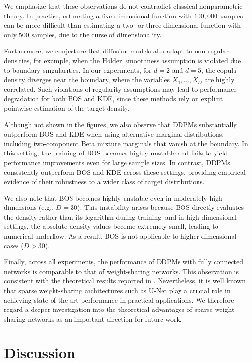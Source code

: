 \documentclass[twoside,11pt]{article}
\newcommand{\Holder}{H\"{o}lder}
\begin{document}
We emphasize that these observations do not contradict classical nonparametric theory. In practice, estimating a five-dimensional function with $100{,}000$ samples can be more difficult than estimating a two- or three-dimensional function with only $500$ samples, due to the curse of dimensionality.

Furthermore, we conjecture that diffusion models also adapt to non-regular densities, for example, when the \Holder \ smoothness assumption is violated due to boundary singularities.
In our experiments, for $d = 2$ and $d = 5$, the copula density diverges near the boundary, where the variables $X_1,\ldots,X_{D}$ are highly correlated.
Such violations of regularity assumptions may lead to performance degradation for both BOS and KDE, since these methods rely on explicit pointwise estimation of the target density.

Although not shown in the figures, we also observe that DDPMs substantially outperform BOS and KDE when using alternative marginal distributions, including two-component Beta mixture marginals that vanish at the boundary. In this setting, the training of BOS becomes highly unstable and fails to yield performance improvements even for large sample sizes. In contrast, DDPMs consistently outperform BOS and KDE across these settings, providing empirical evidence of their robustness to a wider class of target distributions.

We also note that BOS becomes highly unstable even in moderately high dimensions (e.g., $D = 30$). This instability arises because BOS directly evaluates the density rather than its logarithm during training, and in high-dimensional settings, the absolute density values become extremely small, leading to numerical underflow. As a result, BOS is not applicable to higher-dimensional cases ($D > 30$).

Finally, across all experiments, the performance of DDPMs with fully connected networks is comparable to that of weight-sharing networks. This observation is consistent with the theoretical results reported in \citet{fan2025optimal}. Nevertheless, it is well known that sparse weight-sharing architectures such as U-Net play a crucial role in achieving state-of-the-art performance in practical applications. We therefore regard a deeper investigation into the theoretical advantages of sparse weight-sharing networks as an important direction for future work.





\section{Discussion}
\label{sec:disc}
\end{document}
